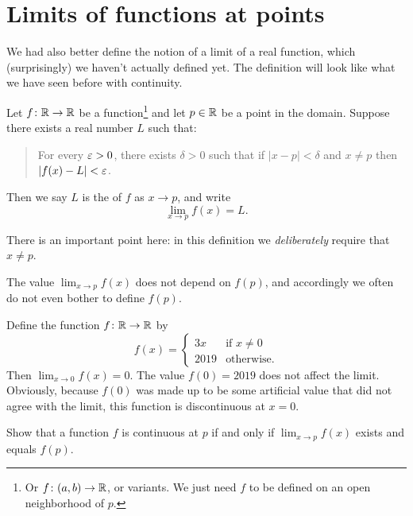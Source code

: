 \section{Limits of functions at points}
We had also better define the notion
of a limit of a real function,
which (surprisingly) we haven't actually defined yet.
The definition will look like what we have seen before with continuity.

\begin{definition}
	Let $f \colon \mathbb R \to \mathbb R$ be a function\footnote{Or
		$f \colon (a,b) \to \mathbb R$, or variants.
		We just need $f$ to be defined on an open neighborhood of $p$.
	} and let $p \in \mathbb R$ be a point in the domain.
	Suppose there exists a real number $L$ such that:
	\begin{quote}
		For every $\varepsilon > 0$, there exists $\delta > 0$
		such that if $\left\lvert x - p \right\rvert < \delta$
		and $x \neq p$ then $\left\lvert f(x) - L \right\rvert < \varepsilon$.
	\end{quote}
	Then we say $L$ is the  of $f$ as $x \to p$, and write
	\[ \lim_{x \to p} f(x) = L. \]
\end{definition}
There is an important point here: in this definition
we \emph{deliberately} require that $x \neq p$.
\begin{moral}
	The value $\lim_{x \to p} f(x)$ does not depend on $f(p)$,
	and accordingly we often do not even bother to define $f(p)$.
\end{moral}
\begin{example}
	Define the function $f \colon \mathbb R \to \mathbb R$ by
	\[ f(x) = \begin{cases}
			3x & \text{if } x \neq 0 \\
			2019 & \text{otherwise}.
		\end{cases} \]
	Then $\lim_{x \to 0} f(x) = 0$.
	The value $f(0) = 2019$ does not affect the limit.
	Obviously, because $f(0)$ was made up to be some artificial
	value that did not agree with the limit,
	this function is discontinuous at $x = 0$.
\end{example}

\begin{ques}
	[Mandatory]
	Show that a function $f$ is continuous at $p$
	if and only if $\lim_{x \to p} f(x)$ exists and equals $f(p)$.
\end{ques}


